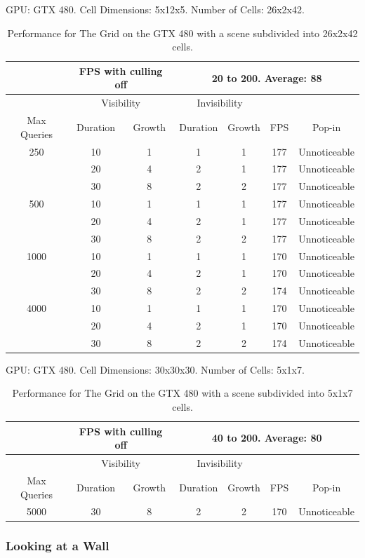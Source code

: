 \documentclass[12pt]{ucthesis}
\newcommand{\captionfonts}{\small\bf\ssp}
\begin{document}
\begin{table}
\begin{center}
GPU: GTX 480.   Cell Dimensions: 5x12x5.   Number of Cells: 26x2x42.
\begin{tabular}{|c|c|c|c|c|c|c|}
\hline
&\multicolumn{2}{c|}{FPS with culling off}&\multicolumn{4}{c|}{20 to 200.  Average: 88}
\tabularnewline
\hline 
&\multicolumn{2}{c|}{Visibility}&\multicolumn{2}{c|}{Invisibility}&&
\tabularnewline
Max Queries&Duration&Growth&Duration&Growth&FPS&Pop-in
\tabularnewline
\hline
250 & 10& 1& 1& 1& 177& Unnoticeable
\tabularnewline
     & 20& 4& 2& 1& 177& Unnoticeable
\tabularnewline
     & 30& 8& 2& 2& 177& Unnoticeable
\tabularnewline
\hline
500 & 10& 1& 1& 1& 177& Unnoticeable
\tabularnewline
     & 20& 4& 2& 1& 177& Unnoticeable
\tabularnewline
     & 30& 8& 2& 2& 177& Unnoticeable
\tabularnewline
\hline
1000 & 10& 1& 1& 1& 170& Unnoticeable
\tabularnewline
     & 20& 4& 2& 1& 170& Unnoticeable
\tabularnewline
     & 30& 8& 2& 2& 174& Unnoticeable
\tabularnewline
\hline
4000 & 10& 1& 1& 1& 170& Unnoticeable
\tabularnewline
     & 20& 4& 2& 1& 170& Unnoticeable
\tabularnewline
     & 30& 8& 2& 2& 174& Unnoticeable
\tabularnewline 
\hline 
\end{tabular}
\captionfonts
\caption[Performance for The Grid]{Performance for The Grid on the GTX 480 with a scene subdivided into 26x2x42 cells.}
\label{table:the-grid-performance-b}
\end{center}
\end{table}

\begin{table}
\begin{center}
GPU: GTX 480.   Cell Dimensions: 30x30x30.   Number of Cells: 5x1x7.
\begin{tabular}{|c|c|c|c|c|c|c|}
\hline
&\multicolumn{2}{c|}{FPS with culling off}&\multicolumn{4}{c|}{40 to 200.  Average: 80}
\tabularnewline
\hline 
&\multicolumn{2}{c|}{Visibility}&\multicolumn{2}{c|}{Invisibility}&&
\tabularnewline
Max Queries&Duration&Growth&Duration&Growth&FPS&Pop-in
\tabularnewline
\hline
5000 & 30& 8& 2& 2& 170& Unnoticeable
\tabularnewline
\hline 
\end{tabular}
\captionfonts
\caption[Performance for The Grid]{Performance for The Grid on the GTX 480 with a scene subdivided into 5x1x7 cells.}
\label{table:the-grid-performance-c}
\end{center}
\end{table}

\subsubsection{Looking at a Wall}
\label{Looking at a wall}
\end{document}

